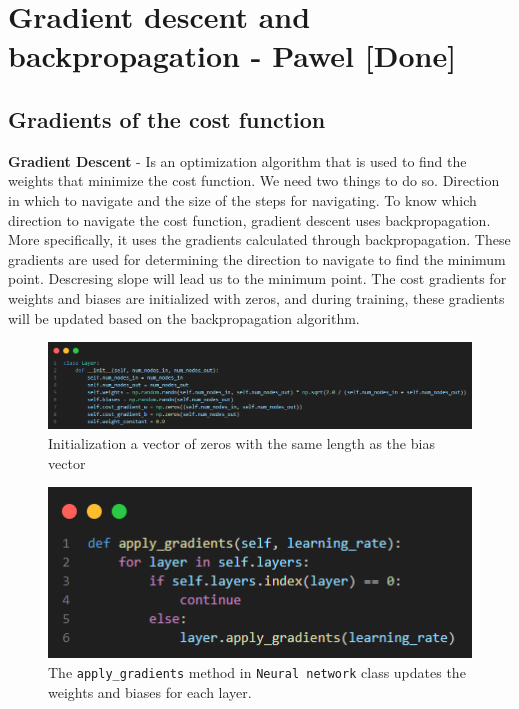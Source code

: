 \documentclass{article}
\begin{document}
\newpage
\section{Gradient descent and backpropagation - Pawel [Done]}
\subsection{Gradients of the cost function}
\textbf{Gradient Descent} - Is an optimization algorithm that is used to find the weights that minimize the cost function. 
We need two things to do so. Direction in which to navigate and the size of the steps for navigating.
To know which direction to navigate the cost function, gradient descent uses backpropagation. More specifically, it uses the gradients calculated through backpropagation. These gradients are used for determining the direction to navigate to find the minimum point. Descresing slope will lead us to the minimum point.
The cost gradients for weights and biases are initialized with zeros, and during training, these gradients will be updated based on the backpropagation algorithm.

\begin{figure}[ht]
    \centering 
    \includegraphics[width=1\textwidth]{images/Xavier-Glorot-initialization-for-weights.png}
    \caption{Initialization a vector of zeros with the same length as the bias vector}
    \label{fig:initialized_cost_gradient}
\end{figure}

\begin{figure}[ht]
    \centering 
    \includegraphics[width=1\textwidth]{images/apply-gradients.png}
    \caption{The \texttt{apply\_gradients} method in \texttt{Neural network} class  updates the weights and biases for each layer.}
    \label{fig:apply_gradients}
\end{figure}
\end{document}
